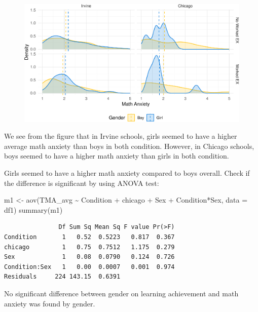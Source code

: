 \documentclass[
  letterpaper,
  DIV=11,
  numbers=noendperiod]{scrartcl}
\newenvironment{Shaded}{\begin{snugshade}}{\end{snugshade}}
\newcommand{\AttributeTok}[1]{\textcolor[rgb]{0.49,0.56,0.16}{#1}}
\newcommand{\FunctionTok}[1]{\textcolor[rgb]{0.02,0.16,0.49}{#1}}
\newcommand{\NormalTok}[1]{\textcolor[rgb]{0.00,0.44,0.13}{#1}}
\newcommand{\OtherTok}[1]{\textcolor[rgb]{0.00,0.44,0.13}{#1}}
\newcommand{\SpecialCharTok}[1]{\textcolor[rgb]{0.25,0.44,0.63}{#1}}
\begin{document}
\begin{figure}[H]

{\centering \includegraphics{modeling3_files/figure-pdf/unnamed-chunk-5-1.pdf}

}

\end{figure}

We see from the figure that in Irvine schools, girls seemed to have a
higher average math anxiety than boys in both condition. However, in
Chicago schools, boys seemed to have a higher math anxiety than girls in
both condition.

Girls seemed to have a higher math anxiety compared to boys overall.
Check if the difference is significant by using ANOVA test:

\begin{Shaded}
\begin{Highlighting}[]
\NormalTok{m1 }\OtherTok{\textless{}{-}} \FunctionTok{aov}\NormalTok{(TMA\_avg }\SpecialCharTok{\textasciitilde{}}\NormalTok{ Condition }\SpecialCharTok{+}\NormalTok{ chicago }\SpecialCharTok{+}\NormalTok{ Sex }\SpecialCharTok{+}\NormalTok{ Condition}\SpecialCharTok{*}\NormalTok{Sex, }
          \AttributeTok{data =}\NormalTok{ df1)}
\FunctionTok{summary}\NormalTok{(m1)}
\end{Highlighting}
\end{Shaded}

\begin{verbatim}
               Df Sum Sq Mean Sq F value Pr(>F)
Condition       1   0.52  0.5223   0.817  0.367
chicago         1   0.75  0.7512   1.175  0.279
Sex             1   0.08  0.0790   0.124  0.726
Condition:Sex   1   0.00  0.0007   0.001  0.974
Residuals     224 143.15  0.6391               
\end{verbatim}

No significant difference between gender on learning achievement and
math anxiety was found by gender.
\end{document}
